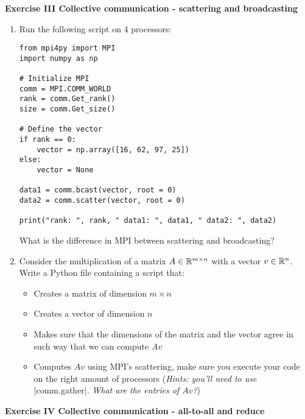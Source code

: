 \documentclass[11pt]{article}
\begin{document}
\bigskip

{\bf{Exercise III Collective communication - scattering and broadcasting}}\\

\begin{enumerate}
    \item Run the following script on 4 processors:  
    \begin{verbatim}
from mpi4py import MPI
import numpy as np

# Initialize MPI
comm = MPI.COMM_WORLD
rank = comm.Get_rank()
size = comm.Get_size()

# Define the vector
if rank == 0:
    vector = np.array([16, 62, 97, 25])
else:
    vector = None

data1 = comm.bcast(vector, root = 0)
data2 = comm.scatter(vector, root = 0)

print("rank: ", rank, " data1: ", data1, " data2: ", data2) 
    \end{verbatim}
    What is the difference in MPI between scattering and broadcasting? %
    \item Consider the multiplication of a matrix $A \in \mathbb{R}^{m \times n}$ with a vector $v \in \mathbb{R}^n$. Write a Python file containing a script that:
    \begin{itemize}
        \item Creates a matrix of dimension $m \times n$
        \item Creates a vector of dimension $n$
        \item Makes sure that the dimensions of the matrix and the vector agree in such way that we can compute $Av$
        \item Computes $Av$ using MPI's scattering, make sure you execute your code on the right amount of processors (\textit{Hints: you'll need to use} |comm.gather|. \textit{What are the entries of $Av$?})
    \end{itemize}
\end{enumerate}

{\bf{Exercise IV Collective communication - all-to-all and reduce }}\\
\end{document}
